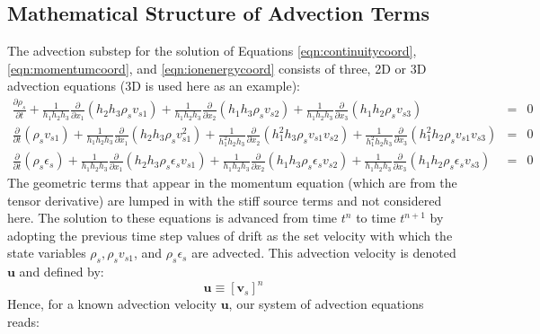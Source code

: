 \documentclass[11pt,letterpaper]{article}
\begin{document}
\subsection{Mathematical Structure of Advection Terms}

The advection substep for the solution of Equations \ref{eqn:continuitycoord}, \ref{eqn:momentumcoord}, and \ref{eqn:ionenergycoord} consists of three, 2D or 3D advection equations (3D is used here as an example):
\begin{eqnarray}
\frac{\partial \rho_s}{\partial t} + \frac{1}{h_1 h_2 h_3} \frac{\partial}{\partial x_1} \left( h_2 h_3 \rho_s v_{s1} \right) + \frac{1}{h_1 h_2 h_3} \frac{\partial}{\partial x_2} \left( h_1 h_3 \rho_s v_{s2} \right) + \frac{1}{h_1 h_2 h_3} \frac{\partial}{\partial x_3} \left( h_1 h_2 \rho_s v_{s3} \right) &=& 0 \nonumber \\
\frac{\partial}{\partial t} \left( \rho_s v_{s1} \right) + \frac{1}{h_1 h_2 h_3} \frac{\partial}{\partial x_1} \left( h_2 h_3 \rho_s v_{s1}^2 \right) + \frac{1}{h_1^2 h_2 h_3} \frac{\partial}{\partial x_2} \left( h_1^2 h_3 \rho_s v_{s1} v_{s2} \right) + \frac{1}{h_1^2 h_2 h_3} \frac{\partial}{\partial x_3} \left( h_1^2 h_2 \rho_s v_{s1} v_{s3} \right) &=& 0 \nonumber \\
\frac{\partial}{\partial t} \left( \rho_s \epsilon_s \right) + \frac{1}{h_1 h_2 h_3} \frac{\partial}{\partial x_1} \left( h_2 h_3 \rho_s \epsilon_s v_{s1} \right) + \frac{1}{h_1 h_2 h_3} \frac{\partial}{\partial x_2} \left( h_1 h_3 \rho_s \epsilon_s v_{s2} \right) + \frac{1}{h_1 h_2 h_3} \frac{\partial}{\partial x_3} \left( h_1 h_2 \rho_s \epsilon_s v_{s3} \right) &=& 0 \nonumber 
\end{eqnarray}
The geometric terms that appear in the momentum equation (which are from the tensor derivative) are lumped in with the stiff source terms and not considered here.  The solution to these equations is advanced from time $t^n$ to time $t^{n+1}$ by adopting the previous time step values of drift as the set velocity with which the state variables $\rho_s,\rho_s v_{s1}$, and $\rho_s \epsilon_s$ are advected.  This advection velocity is denoted $\mathbf{u}$ and defined by:  
\begin{equation}
\mathbf{u} \equiv [\mathbf{v}_s]^n
\end{equation}
Hence, for a known advection velocity $\mathbf{u}$, our system of advection equations reads:
\end{document}
